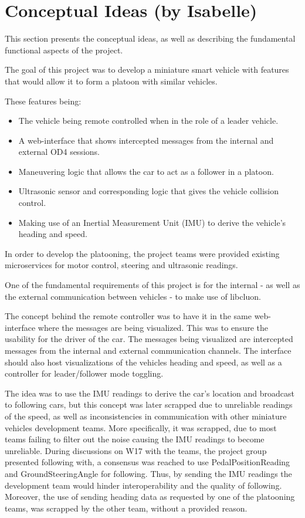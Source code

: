 \documentclass[12pt]{article}
\begin{document}
\section{Conceptual Ideas (by Isabelle)}\label{conceptual ideas}
This section presents the conceptual ideas, as well as describing the fundamental functional aspects of the project.

The goal of this project was to develop a miniature smart vehicle with features that would allow it to form a platoon with similar vehicles. 

These features being:
\begin{itemize}
  \item The vehicle being remote controlled when in the role of a leader vehicle.
  \item A web-interface that shows intercepted messages from the internal and external OD4 sessions.
  \item Maneuvering logic that allows the car to act as a follower in a platoon.
  \item Ultrasonic sensor and corresponding logic that gives the vehicle collision control.
  \item Making use of an Inertial Measurement Unit (IMU) to derive the vehicle's heading and speed. 
\end{itemize}

In order to develop the platooning, the project teams were provided existing microservices for motor control, steering and ultrasonic readings. 

One of the fundamental requirements of this project is for the internal - as well as the external communication between vehicles - to make use of libcluon\cite{libcluon}.

The concept behind the remote controller was to have it in the same web-interface where the messages are being visualized. This was to ensure the usability for the driver of the car. The messages being visualized are intercepted messages from the internal and external communication channels. The interface should also host visualizations of the vehicles heading and speed, as well as a controller for leader/follower mode toggling.   

The idea was to use the IMU readings to derive the car's location and broadcast to following cars, but this concept was later scrapped due to unreliable readings of the speed, as well as inconsistencies in communication with other miniature vehicles development teams.  More specifically, it was scrapped, due to most teams failing to filter out the noise causing the IMU readings to become unreliable. During discussions on W17 with the teams, the project group presented following with, a consensus was reached to use PedalPositionReading and GroundSteeringAngle for following. Thus, by sending the IMU readings the development team would hinder interoperability and the quality of following. Moreover, the use of sending heading data as requested by one of the platooning teams, was scrapped by the other team, without a provided reason.
\end{document}
